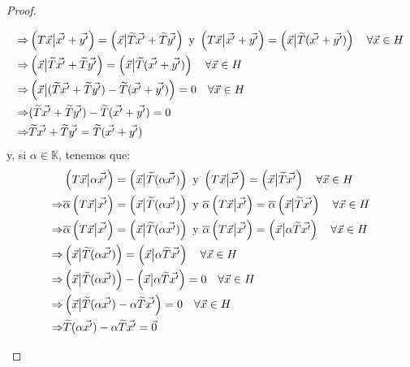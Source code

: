 \documentclass[12pt]{report}
\theoremstyle{largebreak}
\newcommand\adj[1]{\ensuremath{\widetilde{#1}}}
\newcommand\pint[2]{\ensuremath{\left(#1\big|#2\right)}}
\newcommand\conj[1]{\ensuremath{\overline{#1}}}
\begin{document}
\begin{proof}
\begin{itemize}
\begin{equation*}
\begin{split}
                    \Rightarrow& \pint{T\vec{x}}{\vec{x'}+\vec{y'}}=\pint{\vec{x}}{\adj{T}\vec{x'}+\adj{T}\vec{y'}}\textup{ y }\pint{T\vec{x}}{\vec{x'}+\vec{y'}}=\pint{\vec{x}}{\adj{T}(\vec{x'}+\vec{y'})}\quad\forall\vec{x}\in H\\
                    \Rightarrow& \pint{\vec{x}}{\adj{T}\vec{x'}+\adj{T}\vec{y'}}=\pint{\vec{x}}{\adj{T}(\vec{x'}+\vec{y'})}\quad\forall\vec{x}\in H\\
                    \Rightarrow& \pint{\vec{x}}{(\adj{T}\vec{x'}+\adj{T}\vec{y'})-\adj{T}(\vec{x'}+\vec{y'})}=0\quad\forall\vec{x}\in H\\
                    \Rightarrow& (\adj{T}\vec{x'}+\adj{T}\vec{y'})-\adj{T}(\vec{x'}+\vec{y'})=0\\
                    \Rightarrow& \adj{T}\vec{x'}+\adj{T}\vec{y'}=\adj{T}(\vec{x'}+\vec{y'})\\
                \end{split}
            \end{equation*}
            y, si $\alpha\in\mathbb{K}$, tenemos que:
            \begin{equation*}
                \begin{split}
                    &\pint{T\vec{x}}{\alpha\vec{x'}}=\pint{\vec{x}}{\adj{T}(\alpha\vec{x'})}\textup{ y }\pint{T\vec{x}}{\vec{x'}}=\pint{\vec{x}}{\adj{T}\vec{x'}}\quad\forall\vec{x}\in H\\
                    \Rightarrow&\conj{\alpha} \pint{T\vec{x}}{\vec{x'}}=\pint{\vec{x}}{\adj{T}(\alpha\vec{x'})}\textup{ y }\conj{\alpha}\pint{T\vec{x}}{\vec{x'}}=\conj{\alpha}\pint{\vec{x}}{\adj{T}\vec{x'}}\quad\forall\vec{x}\in H\\
                    \Rightarrow&\conj{\alpha} \pint{T\vec{x}}{\vec{x'}}=\pint{\vec{x}}{\adj{T}(\alpha\vec{x'})}\textup{ y }\conj{\alpha}\pint{T\vec{x}}{\vec{x'}}=\pint{\vec{x}}{\alpha\adj{T}\vec{x'}}\quad\forall\vec{x}\in H\\
                    \Rightarrow&\pint{\vec{x}}{\adj{T}(\alpha\vec{x'})}=\pint{\vec{x}}{\alpha\adj{T}\vec{x'}}\quad\forall\vec{x}\in H\\
                    \Rightarrow&\pint{\vec{x}}{\adj{T}(\alpha\vec{x'})}-\pint{\vec{x}}{\alpha\adj{T}\vec{x'}}=0\quad\forall\vec{x}\in H\\
                    \Rightarrow&\pint{\vec{x}}{\adj{T}(\alpha\vec{x'})-\alpha\adj{T}\vec{x'}}=0\quad\forall\vec{x}\in H\\
                    \Rightarrow&\adj{T}(\alpha\vec{x'})-\alpha\adj{T}\vec{x'}=\vec{0}\\

\end{split}
\end{equation*}
\end{itemize}
\end{proof}
\end{document}
